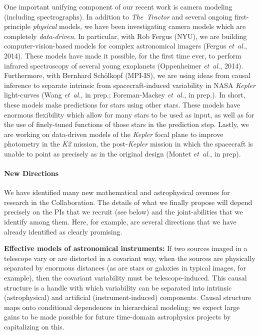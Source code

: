 \documentclass[12pt]{article}
\newcommand{\foreign}[1]{\textsl{#1}}
\newcommand{\etal}{\foreign{et~al.}}
\newcommand{\project}[1]{\textsl{#1}}
\begin{document}
One important unifying component of our recent work is camera modeling
(including spectrographs).
In addition to \project{The~Tractor} and several ongoing first-principle
\emph{physical} models, we have been investigating camera models which
are completely \emph{data-driven}.
In particular, with Rob Fergus (NYU), we are building
computer-vision-based models for complex astronomical imagers (Fergus
\etal, 2014).
These models have made it possible, for the first time ever, to perform
infrared spectroscopy of several young exoplanets (Oppenheimer \etal,
2014).
Furthermore, with Bernhard Sch\"olkopf (MPI-IS), we are using ideas from
causal inference to separate intrinsic from spacecraft-induced
variability in NASA \project{Kepler} light-curves (Wang \etal, in prep.;
Foreman-Mackey \etal, in prep.).
In short, these models make predictions for stars using other stars.
These models have enormous flexibility which allow for many stars to be
used as input, as well as for the use of finely-tuned functions of those
stars in the prediction step.
Lastly, we are working on data-driven models of the \project{Kepler}
focal plane to improve photometry in the \project{K2} mission, the
post-\project{Kepler} mission in which the spacecraft is unable to point
as precisely as in the original design (Montet \etal, in prep).

\paragraph{New Directions}

We have identified many new mathematical and astrophysical avenues for
research in the Collaboration.
The details of what we finally propose will depend precisely on the
PIs that we recruit (see below) and the joint-abilities that we
identify among them.
Here, for example, are several directions that we have already
identified as clearly promising.

\textbf{Effective models of astronomical instruments:}
If two sources imaged in a telescope vary or are distorted in a covariant
way, when the sources are physically separated by enormous distances
(as are stars or galaxies in typical images, for example), then the covariant
variability must be telescope-induced.
This causal structure is a handle with which variability can be separated
into intrinsic (astrophysical) and artificial (instrument-induced) components.
Causal structure maps onto conditional dependences in hierarchical modeling;
we expect large gains to be made possible for future time-domain astrophysics projects
by capitalizing on this.
\end{document}
